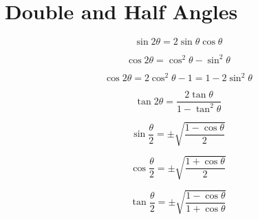 \documentclass[a4paper]{book}
\begin{document}
\section{Double and Half Angles}
\begin{description}
\item \begin{equation} \sin 2\theta = 2 \sin \theta \cos \theta \end{equation}
\item \begin{equation} \cos 2\theta = \cos^2 \theta - \sin^2 \theta \end{equation}
\item \begin{equation} \cos 2\theta = 2\cos^2 \theta - 1  = 1 - 2 \sin^2 \theta \end{equation}
\item \begin{equation} \tan 2\theta = \frac{2 \tan \theta}{1 - \tan^2 \theta} \end{equation}
\item \begin{equation} \sin \frac{\theta}{2} = \pm \sqrt{\frac{1 - \cos \theta}{2}} \end{equation}
\item \begin{equation} \cos \frac{\theta}{2} = \pm \sqrt{\frac{1 + \cos \theta}{2}} \end{equation}
\item \begin{equation} \tan \frac{\theta}{2} = \pm \sqrt{\frac{1 - \cos \theta}{1 + \cos \theta}} \end{equation}
\end{description}
\end{document}
